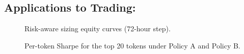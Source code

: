 \documentclass[
  a4paper,
  DIV=11,
  numbers=noendperiod]{scrreprt}
\begin{document}
\subsection{Applications to Trading:}\label{applications-to-trading}

\begin{figure}


\caption{\label{fig-equity-curves}Risk-aware sizing equity curves
(72-hour step).}

\end{figure}%

\begin{figure}


\caption{\label{fig-token-sharpe-qrf}Per-token Sharpe for the top 20
tokens under Policy A and Policy B.}

\end{figure}%
\end{document}
